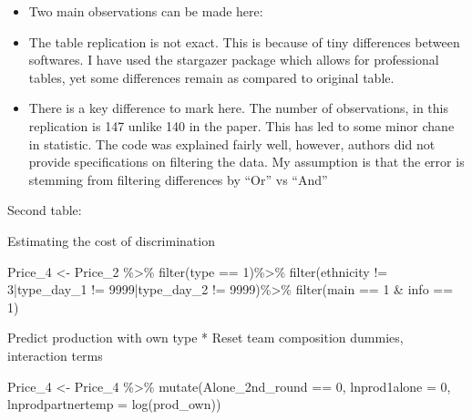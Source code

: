 \documentclass[
]{article}
\newenvironment{Shaded}{\begin{snugshade}}{\end{snugshade}}
\newcommand{\AttributeTok}[1]{\textcolor[rgb]{0.77,0.63,0.00}{#1}}
\newcommand{\DecValTok}[1]{\textcolor[rgb]{0.00,0.00,0.81}{#1}}
\newcommand{\FunctionTok}[1]{\textcolor[rgb]{0.00,0.00,0.00}{#1}}
\newcommand{\NormalTok}[1]{#1}
\newcommand{\OtherTok}[1]{\textcolor[rgb]{0.56,0.35,0.01}{#1}}
\newcommand{\SpecialCharTok}[1]{\textcolor[rgb]{0.00,0.00,0.00}{#1}}
\providecommand{\tightlist}{%
  \setlength{\itemsep}{0pt}\setlength{\parskip}{0pt}}
\begin{document}
\begin{itemize}
\tightlist
\item
  Two main observations can be made here:
\item
  The table replication is not exact. This is because of tiny
  differences between softwares. I have used the stargazer package which
  allows for professional tables, yet some differences remain as
  compared to original table.
\item
  There is a key difference to mark here. The number of observations, in
  this replication is 147 unlike 140 in the paper. This has led to some
  minor chane in statistic. The code was explained fairly well, however,
  authors did not provide specifications on filtering the data. My
  assumption is that the error is stemming from filtering differences by
  ``Or'' vs ``And''
\end{itemize}

Second table:

Estimating the cost of discrimination

\begin{Shaded}
\begin{Highlighting}[]
\NormalTok{Price\_4 }\OtherTok{\textless{}{-}}\NormalTok{ Price\_2 }\SpecialCharTok{\%\textgreater{}\%}
  \FunctionTok{filter}\NormalTok{(type }\SpecialCharTok{==} \DecValTok{1}\NormalTok{)}\SpecialCharTok{\%\textgreater{}\%}
  \FunctionTok{filter}\NormalTok{(ethnicity }\SpecialCharTok{!=} \DecValTok{3}\SpecialCharTok{|}\NormalTok{type\_day\_1 }\SpecialCharTok{!=} \DecValTok{9999}\SpecialCharTok{|}\NormalTok{type\_day\_2 }\SpecialCharTok{!=} \DecValTok{9999}\NormalTok{)}\SpecialCharTok{\%\textgreater{}\%}
  \FunctionTok{filter}\NormalTok{(main }\SpecialCharTok{==} \DecValTok{1} \SpecialCharTok{\&}\NormalTok{ info }\SpecialCharTok{==} \DecValTok{1}\NormalTok{)}
\end{Highlighting}
\end{Shaded}

Predict production with own type * Reset team composition dummies,
interaction terms

\begin{Shaded}
\begin{Highlighting}[]
\NormalTok{Price\_4 }\OtherTok{\textless{}{-}}\NormalTok{ Price\_4 }\SpecialCharTok{\%\textgreater{}\%}
  \FunctionTok{mutate}\NormalTok{(Alone\_2nd\_round }\SpecialCharTok{==} \DecValTok{0}\NormalTok{, }
         \AttributeTok{lnprod1alone =} \DecValTok{0}\NormalTok{,}
         \AttributeTok{lnprodpartnertemp =} \FunctionTok{log}\NormalTok{(prod\_own))}
\end{Highlighting}
\end{Shaded}
\end{document}
